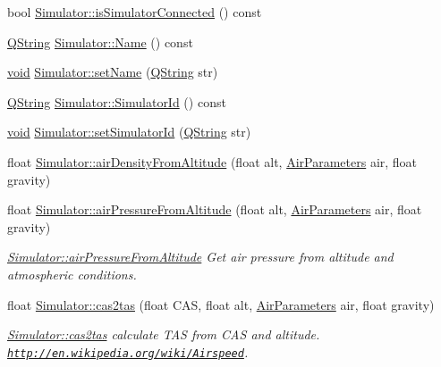 \begin{DoxyCompactItemize}
\item 
bool \hyperlink{group___h_i_t_l_plugin_ga4736ea66352f66d9977879364f3c3c0a}{\-Simulator\-::is\-Simulator\-Connected} () const 
\item 
\hyperlink{group___u_a_v_objects_plugin_gab9d252f49c333c94a72f97ce3105a32d}{\-Q\-String} \hyperlink{group___h_i_t_l_plugin_ga40c6b40efb10e456ccedfdcd88d5988d}{\-Simulator\-::\-Name} () const 
\item 
\hyperlink{group___u_a_v_objects_plugin_ga444cf2ff3f0ecbe028adce838d373f5c}{void} \hyperlink{group___h_i_t_l_plugin_ga11bc3ca9ef98431bcb82d8b72ad127b8}{\-Simulator\-::set\-Name} (\hyperlink{group___u_a_v_objects_plugin_gab9d252f49c333c94a72f97ce3105a32d}{\-Q\-String} str)
\item 
\hyperlink{group___u_a_v_objects_plugin_gab9d252f49c333c94a72f97ce3105a32d}{\-Q\-String} \hyperlink{group___h_i_t_l_plugin_gac518ebc236c9f36b629c1145408315aa}{\-Simulator\-::\-Simulator\-Id} () const 
\item 
\hyperlink{group___u_a_v_objects_plugin_ga444cf2ff3f0ecbe028adce838d373f5c}{void} \hyperlink{group___h_i_t_l_plugin_ga7c1b69b9900d1cb7e5b849f98adf0f9c}{\-Simulator\-::set\-Simulator\-Id} (\hyperlink{group___u_a_v_objects_plugin_gab9d252f49c333c94a72f97ce3105a32d}{\-Q\-String} str)
\item 
float \hyperlink{group___h_i_t_l_plugin_ga20d3be9c0283514b5e2ca35280a86665}{\-Simulator\-::air\-Density\-From\-Altitude} (float alt, \hyperlink{struct_air_parameters}{\-Air\-Parameters} air, float gravity)
\item 
float \hyperlink{group___h_i_t_l_plugin_gab5a7232560191dad8ff19517ed4a327a}{\-Simulator\-::air\-Pressure\-From\-Altitude} (float alt, \hyperlink{struct_air_parameters}{\-Air\-Parameters} air, float gravity)
\begin{DoxyCompactList}\small\item\em \hyperlink{group___h_i_t_l_plugin_gab5a7232560191dad8ff19517ed4a327a}{\-Simulator\-::air\-Pressure\-From\-Altitude} \-Get air pressure from altitude and atmospheric conditions. \end{DoxyCompactList}\item 
float \hyperlink{group___h_i_t_l_plugin_ga86d7635f63f32cf0ef08e21a7e2874ea}{\-Simulator\-::cas2tas} (float \-C\-A\-S, float alt, \hyperlink{struct_air_parameters}{\-Air\-Parameters} air, float gravity)
\begin{DoxyCompactList}\small\item\em \hyperlink{group___h_i_t_l_plugin_ga86d7635f63f32cf0ef08e21a7e2874ea}{\-Simulator\-::cas2tas} calculate \-T\-A\-S from \-C\-A\-S and altitude. \href{http://en.wikipedia.org/wiki/Airspeed}{\tt http\-://en.\-wikipedia.\-org/wiki/\-Airspeed}. \end{DoxyCompactList}\item 

\end{DoxyCompactItemize}
